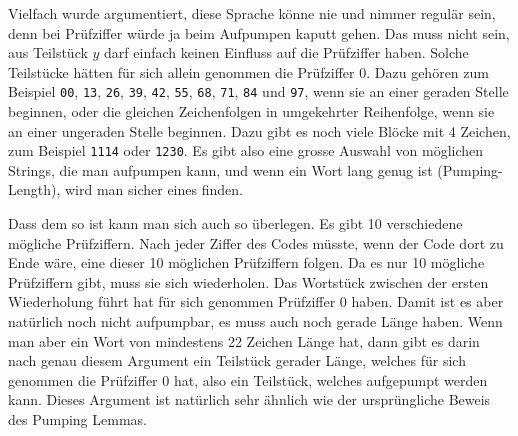 \begin{loesung}
Vielfach wurde argumentiert, diese Sprache könne nie und nimmer
regulär sein, denn bei Prüfziffer würde ja beim Aufpumpen
kaputt gehen. Das muss nicht sein, aus Teilstück $y$ darf
einfach keinen Einfluss auf die Prüfziffer haben. Solche
Teilstücke hätten für sich allein genommen die Prüfziffer 0.
Dazu gehören zum Beispiel
{\tt 00},
{\tt 13},
{\tt 26},
{\tt 39},
{\tt 42},
{\tt 55},
{\tt 68},
{\tt 71},
{\tt 84}
und
{\tt 97}, wenn sie an einer geraden Stelle beginnen, oder
die gleichen Zeichenfolgen in umgekehrter Reihenfolge, wenn sie
an einer ungeraden Stelle beginnen.
Dazu gibt es noch viele Blöcke mit 4 Zeichen, zum Beispiel
{\tt 1114} oder {\tt 1230}. Es gibt also eine grosse Auswahl von
möglichen Strings, die man aufpumpen kann, und wenn ein Wort
lang genug ist (Pumping-Length), wird man sicher eines finden.

Dass dem so ist kann man sich auch so überlegen. Es gibt 10
verschiedene mögliche Prüfziffern. Nach jeder Ziffer des Codes müsste,
wenn der Code dort zu Ende wäre, eine dieser 10 möglichen Prüfziffern
folgen. Da es nur 10 mögliche Prüfziffern gibt, muss sie sich
wiederholen.
Das Wortstück zwischen der ersten Wiederholung führt hat für sich
genommen Prüfziffer 0 haben. Damit ist es aber natürlich noch
nicht aufpumpbar, es muss auch noch gerade Länge haben. Wenn man
aber ein Wort von mindestens 22 Zeichen Länge hat, dann gibt es
darin nach genau diesem Argument ein Teilstück gerader Länge,
welches für sich genommen die Prüfziffer 0 hat, also ein Teilstück,
welches aufgepumpt werden kann. Dieses Argument ist natürlich
sehr ähnlich wie der ursprüngliche Beweis des Pumping Lemmas.


\end{loesung}

